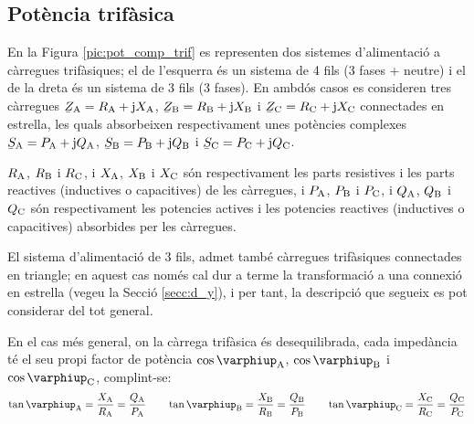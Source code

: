 \subsection{Pot\`{e}ncia trif\`{a}sica}  \label{sec:pot-trif}

En la Figura \vref{pic:pot_comp_trif} es representen dos sistemes
d'alimentaci\'{o} a c\`{a}rregues trif\`{a}siques; el de l'esquerra \'{e}s un
sistema de 4 fils (3 fases + neutre) i el de la dreta \'{e}s un sistema
de 3 fils (3 fases). En ambd\'{o}s casos es consideren tres c\`{a}rregues
$\cmplx{Z}\ped{A} = R\ped{A} + \ju X\ped{A}$, $\cmplx{Z}\ped{B}=
R\ped{B} + \ju X\ped{B}$ i $\cmplx{Z}\ped{C}= R\ped{C} + \ju X\ped{C}$
connectades en estrella, les quals absorbeixen respectivament unes
pot\`{e}ncies complexes $\cmplx{S}\ped{A} = P\ped{A} + \ju Q\ped{A}$,
$\cmplx{S}\ped{B}= P\ped{B} + \ju Q\ped{B}$ i $\cmplx{S}\ped{C}=
P\ped{C} + \ju Q\ped{C}$.

$R_\mathrm{A}$, $R_\mathrm{B}$ i $R_\mathrm{C}$, i $X_\mathrm{A}$, $X_\mathrm{B}$ i
$X_\mathrm{C}$ s\'{o}n respectivament les parts resistives i les parts
reactives (inductives o capacitives) de les c\`{a}rregues, i $P_\mathrm{A}$,
$P_\mathrm{B}$ i $P_\mathrm{C}$, i $Q_\mathrm{A}$, $Q_\mathrm{B}$ i $Q_\mathrm{C}$ s\'{o}n
respectivament les potencies actives i les potencies reactives
(inductives o capacitives) absorbides per les c\`{a}rregues.

El sistema d'alimentaci\'{o} de 3 fils, admet tamb\'{e} c\`{a}rregues
trif\`{a}siques connectades en triangle; en aquest cas nom\'{e}s cal dur a
terme la transformaci\'{o} a una connexi\'{o} en estrella (vegeu la Secci\'{o}
\ref{secc:d_y}), i per tant, la descripci\'{o} que segueix es pot
considerar del tot general.

\begin{center}
    
    \label{pic:pot_comp_trif}
\end{center}

En el cas m\'{e}s general, on la c\`{a}rrega trif\`{a}sica \'{e}s desequilibrada,
cada imped\`{a}ncia t\'{e} el seu propi factor de pot\`{e}ncia
$\cos\varphiup\ped{A}$, $\cos\varphiup\ped{B}$ i $\cos\varphiup\ped{C}$,
complint-se:
\begin{equation}
    \tan\varphiup\ped{A} = \frac{X\ped{A}}{R\ped{A}} = \frac{Q\ped{A}}{P\ped{A}} \qquad
    \tan\varphiup\ped{B} = \frac{X\ped{B}}{R\ped{B}} = \frac{Q\ped{B}}{P\ped{B}} \qquad
    \tan\varphiup\ped{C} = \frac{X\ped{C}}{R\ped{C}} = \frac{Q\ped{C}}{P\ped{C}}
\end{equation}

